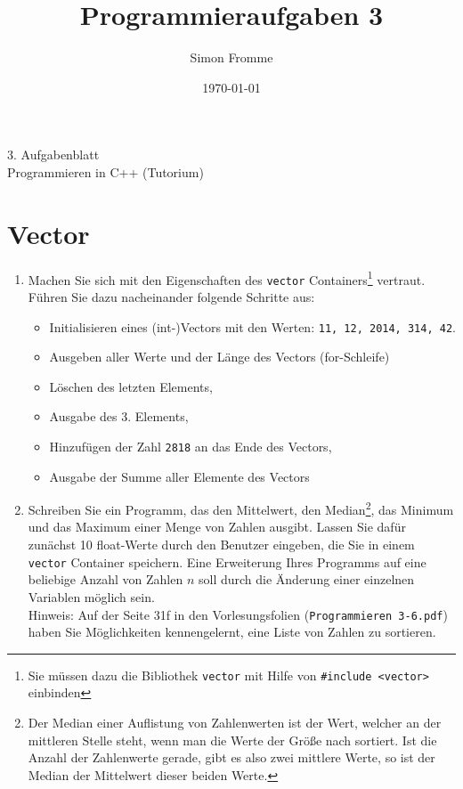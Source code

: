 \documentclass[paper=a4, fontsize=11pt, twoside]{scrartcl}
\title{Programmieraufgaben 3}
\author{Simon Fromme}
\date{\normalsize\today}
\begin{document}
\vspace*{0.75\baselineskip}
\begin{center}
  \Large 3. Aufgabenblatt \\\vspace{0.5em} \large Programmieren in C++ (Tutorium)
\end{center}

\section*{Vector}
\begin{enumerate}
\item Machen Sie sich mit den Eigenschaften des \texttt{vector} Containers\footnote{Sie müssen dazu die Bibliothek \texttt{vector} mit Hilfe von \texttt{#include <vector>} einbinden } vertraut. Führen Sie dazu nacheinander folgende Schritte aus:
  \begin{itemize}
  \item Initialisieren eines (int-)Vectors mit den Werten: \texttt{11, 12, 2014, 314, 42}.
  \item Ausgeben aller Werte und der Länge des Vectors (for-Schleife)
  \item Löschen des letzten Elements,
  \item Ausgabe des 3. Elements,
  \item Hinzufügen der Zahl \texttt{2818} an das Ende des Vectors,
  \item Ausgabe der Summe aller Elemente des Vectors
  \end{itemize}

\item Schreiben Sie ein Programm, das den Mittelwert, den Median\footnote{Der Median einer Auflistung von Zahlenwerten ist der Wert, welcher an der mittleren Stelle steht, wenn man die Werte der Größe nach sortiert. Ist die Anzahl der Zahlenwerte gerade, gibt es also zwei mittlere Werte, so ist der Median der Mittelwert dieser beiden Werte.}, das Minimum und das Maximum einer Menge von Zahlen ausgibt. Lassen Sie dafür zunächst 10 float-Werte durch den Benutzer eingeben, die Sie in einem \texttt{vector} Container speichern. Eine Erweiterung Ihres Programms auf eine beliebige Anzahl von Zahlen $n$ soll durch die Änderung einer einzelnen Variablen möglich sein. \\
Hinweis: Auf der Seite 31f in den Vorlesungsfolien (\texttt{Programmieren 3-6.pdf}) haben Sie Möglichkeiten kennengelernt, eine Liste von Zahlen zu sortieren.
\end{enumerate}
\end{document}
